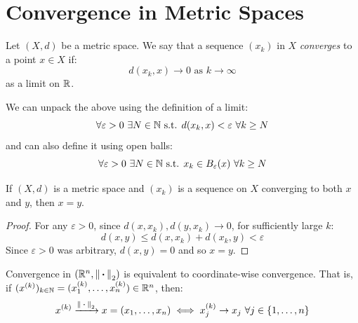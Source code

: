 \documentclass[../main.tex]{subfiles}
\begin{document}
\section{Convergence in Metric Spaces}
\begin{definition}
  Let $(X, d)$ be a metric space.
  We say that a sequence $(x_k)$ in $X$ \textit{converges} to a point $x \in X$ if:
  \[
    d(x_k, x) \to 0 \text{ as $k \to \infty$}
  \]
  as a limit on $\mathbb{R}$.
\end{definition}
\begin{remark}
  We can unpack the above using the definition of a limit:
  \[
    \forall \varepsilon > 0\ \exists N \in \mathbb{N} \text{ s.t. } d(x_k, x) < \varepsilon\ \forall k \geq N
  \]
  and can also define it using open balls:
  \begin{equation}
    \forall \varepsilon > 0\ \exists N \in \mathbb{N} \text{ s.t. } x_k \in B_{\varepsilon}(x)\ \forall k \geq N \label{openBallConv}
  \end{equation}
\end{remark}
\begin{proposition}
  If $(X, d)$ is a metric space and $(x_k)$ is a sequence on $X$ converging to both $x$ and $y$, then $x = y$. \label{uniqueLim}
\end{proposition}
\begin{proof}
  For any $\varepsilon > 0$, since $d(x, x_k), d(y, x_k) \to 0$, for sufficiently large $k$:
  \[
    d(x, y) \leq d(x, x_k) + d(x_k, y) < \varepsilon
  \]
  Since $\varepsilon > 0$ was arbitrary, $d(x, y) = 0$ and so $x = y$.
\end{proof}
\begin{proposition}
  Convergence in $(\mathbb{R}^n, \left\lVert {\hspace{0.18em}\boldsymbol{\cdot}\hspace{0.18em}} \right\rVert_2)$ is equivalent to coordinate-wise convergence.
  That is, if $(x^{(k)})_{k \in \mathbb{N}} = (x^{(k)}_1, \ldots, x^{(k)}_n) \in \mathbb{R}^{n}$, then: \label{vectorConv}
  \[
    x^{(k)} \xrightarrow{\left\lVert {\hspace{0.18em}\boldsymbol{\cdot}\hspace{0.18em}} \right\rVert_2} x = (x_1, \ldots, x_n) \iff x^{(k)}_j \to x_j\ \forall j \in \{1, \ldots, n\}
  \]
\end{proposition}
\end{document}
